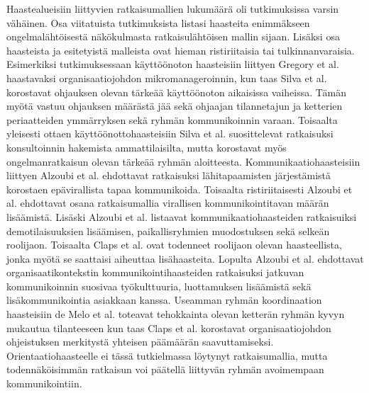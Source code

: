Haastealueisiin liittyvien ratkaisumallien lukumäärä oli tutkimuksissa varsin vähäinen. Osa viitatuista tutkimuksista listasi haasteita enimmäkseen ongelmalähtöisestä näkökulmasta ratkaisulähtöisen mallin sijaan. Lisäksi osa haasteista ja esitetyistä malleista ovat hieman ristiriitaisia tai tulkinnanvaraisia. Esimerkiksi tutkimuksessaan käyttöönoton haasteisiin liittyen Gregory et al. \cite{GREGORY201692} haastavaksi organisaatiojohdon mikromanageroinnin, kun taas Silva et al. \cite{SELLERISILVA201520} korostavat ohjauksen olevan tärkeää käyttöönoton aikaisissa vaiheissa. Tämän myötä vastuu ohjauksen määrästä jää sekä ohjaajan tilannetajun ja ketterien periaatteiden ymmärryksen sekä ryhmän kommunikoinnin varaan. Toisaalta yleisesti ottaen käyttöönottohaasteisiin Silva et al. suosittelevat ratkaisuksi konsultoinnin hakemista ammattilaisilta, mutta korostavat myös ongelmanratkaisun olevan tärkeää ryhmän aloitteesta. Kommunikaatiohaasteisiin liittyen Alzoubi et al. \cite{ALZOUBI201622} ehdottavat ratkaisuksi lähitapaamisten järjestämistä korostaen epävirallista tapaa kommunikoida. Toisaalta ristiriitaisesti Alzoubi et al. ehdottavat osana ratkaisumallia virallisen kommunikointitavan määrän lisäämistä. Lisäski Alzoubi et al. listaavat kommunikaatiohaasteiden ratkaisuiksi demotilaisuuksien lisäämisen, paikallisryhmien muodostuksen sekä selkeän roolijaon. Toisaalta Claps et al. \cite{CLAPS201521} ovat todenneet roolijaon olevan haasteellista, jonka myötä se saattaisi aiheuttaa lisähaasteita. Lopulta Alzoubi et al. \cite{ALZOUBI201622} ehdottavat organisaatikontekstin kommunikointihaasteiden ratkaisuksi jatkuvan kommunikoinnin suosivaa työkulttuuria, luottamuksen lisäämistä sekä lisäkommunikointia asiakkaan kanssa. Useamman ryhmän koordinaation haasteisiin de Melo et al. \cite{DEOMELO2013412} toteavat tehokkainta olevan ketterän ryhmän kyvyn mukautua tilanteeseen kun taas Claps et al. \cite{CLAPS201521} korostavat organisaatiojohdon ohjeistuksen merkitystä yhteisen päämäärän saavuttamiseksi. Orientaatiohaasteelle ei tässä tutkielmassa löytynyt ratkaisumallia, mutta todennäköisimmän ratkaisun voi päätellä liittyvän ryhmän avoimempaan kommunikointiin.


